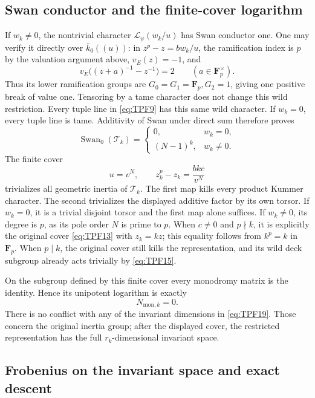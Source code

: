 \subsection{Swan conductor and the finite-cover logarithm}

If \(w_k\ne0\), the nontrivial character
\(\mathcal L_\psi(w_k/u)\) has Swan conductor one.
One may verify it directly over \(\bar k_0((u))\):
in \(z^p-z=bw_k/u\), the ramification index is \(p\)
by the valuation argument above, \(v_E(z)=-1\), and
\[
 v_E\bigl((z+a)^{-1}-z^{-1}\bigr)=2
                         \qquad(a\in\mathbf F_p^\times).
 \tag{TPF.21}\label{eq:TPF21}
\]
Thus its lower ramification groups are
\(G_0=G_1=\mathbf F_p,G_2=1\), giving one positive
break of value one. Tensoring by a tame character
does not change this wild restriction. Every tuple
line in \eqref{eq:TPF9} has this same wild character.
If \(w_k=0\), every tuple line is tame. Additivity of
Swan under direct sum therefore proves
\[
 \boxed{\displaystyle
 \operatorname{Swan}_0(\mathcal T_k)=
 \begin{cases}
 0,&w_k=0,\\
 (N-1)^k,&w_k\ne0 .
 \end{cases}}
 \tag{TPF.22}\label{eq:TPF22}
\]
The finite cover
\[
 u=v^N,\qquad z_k^p-z_k=\frac{bkc}{v^N}
 \tag{TPF.23}\label{eq:TPF23}
\]
trivializes all geometric inertia of \(\mathcal T_k\).
The first map kills every product Kummer character.
The second trivializes the displayed additive factor
by its own torsor. If \(w_k=0\), it is a trivial
disjoint torsor and the first map alone suffices.
If \(w_k\ne0\), its degree is \(p\), as its pole order
\(N\) is prime to \(p\). When \(c\ne0\) and
\(p\nmid k\), it is explicitly the original cover
\eqref{eq:TPF13} with \(z_k=kz\); this equality follows
from \(k^p=k\) in \(\mathbf F_p\).
When \(p\mid k\), the original cover still kills the
representation, and its wild deck subgroup already
acts trivially by \eqref{eq:TPF15}.

On the subgroup defined by this finite cover every
monodromy matrix is the identity. Hence its unipotent
logarithm is exactly
\[
 N_{\mathrm{mon},k}=0 .
 \tag{TPF.24}\label{eq:TPF24}
\]
There is no conflict with any of the invariant
dimensions in \eqref{eq:TPF19}. Those concern the
original inertia group; after the displayed cover,
the restricted representation has the full
\(r_k\)-dimensional invariant space.

\subsection{Frobenius on the invariant space and exact descent}

